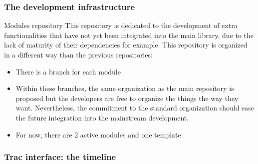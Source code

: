 \documentclass[8pt]{beamer}
\begin{document}
\begin{frame}
  \frametitle{The development infrastructure}
  \begin{block}{Modules repository}
    This repository is dedicated to the development of extra functionalities that have not yet been integrated into the main library, due to the lack of maturity of their dependencies for example. This repository is organized in a different way than the previous repositories:
    \begin{itemize}
    \item There is a branch for each module
    \item Within these branches, \alert{the same organization as the main repository is proposed} but the developers are free to organize the things the way they want. Nevertheless, the commitment to the standard organization should ease the future integration into the mainstream development.
    \item For now, there are 2 active modules and one template.
    \end{itemize}
  \end{block}
\end{frame}
\begin{frame}
  \frametitle{Trac interface: the timeline}
  \centering {}
\end{frame}
\end{document}
